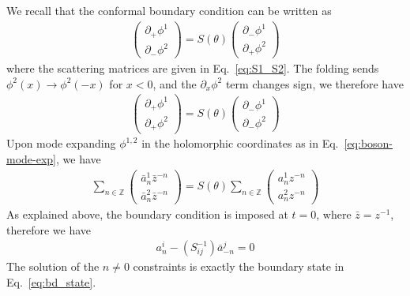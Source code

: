
We recall that the conformal boundary condition can be written as
\begin{equation}
\begin{aligned}
\label{eq:def_S_in_app}
\begin{pmatrix}
\partial_+\phi^1\\
\partial_-\phi^2
\end{pmatrix}
=S(\theta)
\begin{pmatrix}
\partial_-\phi^1\\
\partial_+\phi^2
\end{pmatrix}
\end{aligned}
\end{equation}
where the scattering matrices are given in Eq.~\eqref{eq:S1_S2}. The folding sends $\phi^2(x)\rightarrow\phi^2(-x)$ for $x<0$, and the $\partial_x \phi^2$ term changes sign, we therefore have 
\begin{equation}
\begin{aligned}
\label{eq:def_S_in_app_2}
\begin{pmatrix}
\partial_+\phi^1\\
\partial_+\phi^2
\end{pmatrix}
=S(\theta)
\begin{pmatrix}
\partial_-\phi^1\\
\partial_-\phi^2
\end{pmatrix}
\end{aligned}
\end{equation}
Upon mode expanding $\phi^{1,2}$ in the holomorphic coordinates as in Eq.~\eqref{eq:boson-mode-exp}, we have
\begin{equation}
\begin{aligned}
\label{eq:def_S_in_app_2}
\sum_{n\in\mathbb{Z}}
\begin{pmatrix}
\bar{a}_n^1\bar{z}^{-n}\\
\bar{a}_n^2\bar{z}^{-n}
\end{pmatrix}
=S(\theta)
\sum_{n\in\mathbb{Z}}
\begin{pmatrix}
a_n^1{z}^{-n}\\
a_n^2{z}^{-n}
\end{pmatrix}
\end{aligned}
\end{equation}
As explained above, the boundary condition is imposed at $t=0$, where $\bar{z}=z^{-1}$, therefore we have
\begin{equation}\begin{aligned}
a^i_n-(S^{-1}_{ij})\bar{a}^j_{-n}=0
\end{aligned}\end{equation}
The solution of the $n \ne 0$ constraints is exactly the boundary state in Eq.~\eqref{eq:bd_state}. 

